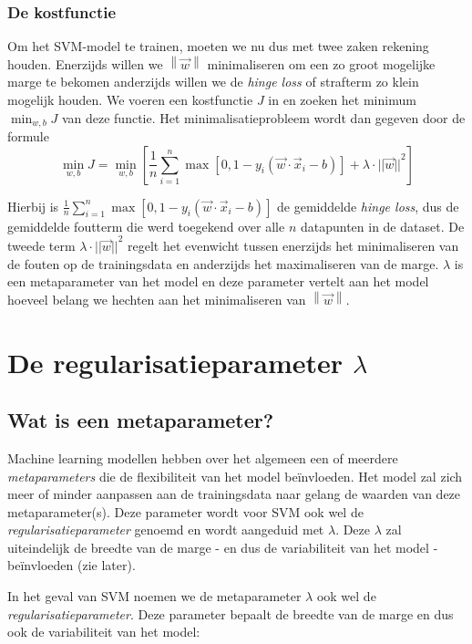 \documentclass[twoside, kulak]{kulakreport}
\newcommand{\norm}[1]{\left\| #1 \right\|}
\begin{document}
	\subsection{De kostfunctie}
	
	Om het SVM-model te trainen, moeten we nu dus met twee zaken rekening houden. Enerzijds willen we \(\norm{\vec{w}}\) minimaliseren om een zo groot mogelijke marge te bekomen anderzijds willen we de \textit{hinge loss} of strafterm zo klein mogelijk houden. We voeren een kostfunctie \(J\) in en zoeken het minimum \(\min_{w, b}J\) van deze functie. Het minimalisatieprobleem wordt dan gegeven door de formule \[\min_{w, b}J=\min_{w, b}\left[\frac{1}{n}\sum_{i=1}^n{\max{[0,1-y_i(\vec{w}\cdot\vec{x}_i-b)]}} + \lambda\cdot{||\vec{w}||}^2\right]\]
	
	Hierbij is \(\frac{1}{n}\sum_{i=1}^n{\max{[0,1-y_i(\vec{w}\cdot\vec{x}_i-b)]}}\) de gemiddelde \textit{hinge loss}, dus de gemiddelde foutterm die werd toegekend over alle \(n\) datapunten in de dataset. De tweede term \(\lambda\cdot{||\vec{w}||}^2\) regelt het evenwicht tussen enerzijds het minimaliseren van de fouten op de trainingsdata en anderzijds het maximaliseren van de marge. \(\lambda\) is een metaparameter van het model en deze parameter vertelt aan het model hoeveel belang we hechten aan het minimaliseren van \(\norm{\vec{w}}\).
	
	\chapter{De regularisatieparameter \(\lambda\)} 
	
	\section{Wat is een metaparameter?}
	
	Machine learning modellen hebben over het algemeen een of meerdere \textit{metaparameters} die de flexibiliteit van het model beïnvloeden. Het model zal zich meer of minder aanpassen aan de trainingsdata naar gelang de waarden van deze metaparameter(s). Deze parameter wordt voor SVM ook wel de \textit{regularisatieparameter} genoemd en wordt aangeduid met \(\lambda\). Deze \(\lambda\) zal uiteindelijk de breedte van de marge - en dus de variabiliteit van het model - beïnvloeden (zie later). 
	
	In het geval van SVM noemen we de metaparameter \(\lambda\) ook wel de \textit{regularisatieparameter}. Deze parameter bepaalt de breedte van de marge en dus ook de variabiliteit van het model:
	
\end{document}
